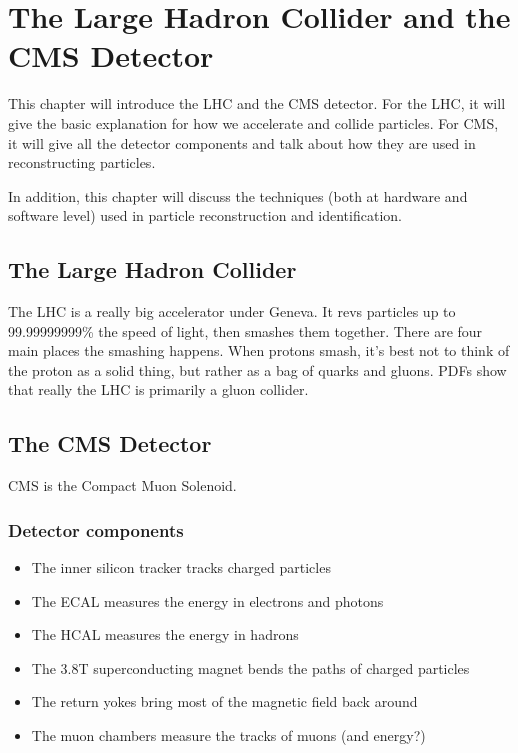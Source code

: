\chapter{The Large Hadron Collider and the CMS Detector}
\label{chap:hardware}

This chapter will introduce the LHC and the CMS detector.
For the LHC, it will give the basic explanation for how we accelerate
and collide particles. For CMS, it will give all the detector components
and talk about how they are used in reconstructing particles.

In addition, this chapter will discuss the techniques (both at hardware
and software level) used in particle reconstruction and identification.

\section{The Large Hadron Collider}
\label{sec:lhc}

The LHC is a really big accelerator under Geneva. It revs particles up
to 99.99999999\% the speed of light, then smashes them together.
There are four main places the smashing happens.
When protons smash, it's best not to think of the proton as a solid
thing, but rather as a bag of quarks and gluons. PDFs show that really
the LHC is primarily a gluon collider.

\section{The CMS Detector}
\label{sec:cms}

CMS is the Compact Muon Solenoid.

\subsection{Detector components}
\label{ssec:cmsparts}

\begin{itemize}
\item The inner silicon tracker tracks charged particles
\item The ECAL measures the energy in electrons and photons
\item The HCAL measures the energy in hadrons
\item The 3.8T superconducting magnet bends the paths of charged particles
\item The return yokes bring most of the magnetic field back around
\item The muon chambers measure the tracks of muons (and energy?)
\end{itemize}

